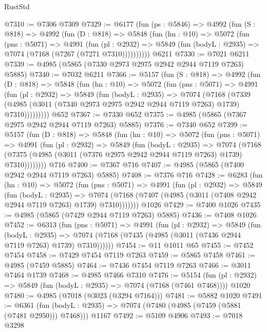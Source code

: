 \begin{lexlean}{RustStd}
\begin{coremodule}
@7310 := @7306 @7309
@7329 := @6177
    (fun (ps : @5846) =>
    @4992
      (fun (S : @818) =>
      @4992
        (fun (D : @818) =>
        @5848
          (fun (hn : @10) =>
          @5072
            (fun (pns : @5071) =>
            @4991
              (fun (pl : @2932) =>
              @5849 (fun (bodyL : @2935) => @7074 (@7168 (@7267 (@7271 @7310))))))))))
    @6211
@7330 := @7021 @6211
@7339 := @4985 (@5865 (@7330 @2973 @2975 @2942 @2944 @7119 @7263) @5885)
@7340 := @7032 @6211
@7366 := @5157
    (fun (S : @818) =>
    @4992
      (fun (D : @818) =>
      @5848
        (fun (hn : @10) =>
        @5072
          (fun (pns : @5071) =>
          @4991
            (fun (pl : @2932) =>
            @5849
              (fun (bodyL : @2935) =>
              @7074
                (@7168
                  (@7339
                    (@4985 (@3011 (@7340 @2973 @2975 @2942 @2944 @7119 @7263) @1739) @7310)))))))))
    @652
@7367 := @7330 @652
@7375 := @4985 (@5865 (@7367 @2975 @2942 @2944 @7119 @7263) @5885)
@7376 := @7340 @652
@7399 := @5157
    (fun (D : @818) =>
    @5848
      (fun (hn : @10) =>
      @5072
        (fun (pns : @5071) =>
        @4991
          (fun (pl : @2932) =>
          @5849
            (fun (bodyL : @2935) =>
            @7074
              (@7168 (@7375 (@4985 (@3011 (@7376 @2975 @2942 @2944 @7119 @7263) @1739) @7310))))))))
    @716
@7400 := @7367 @716
@7407 := @4985 (@5865 (@7400 @2942 @2944 @7119 @7263) @5885)
@7408 := @7376 @716
@7428 := @6283
    (fun (hn : @10) =>
    @5072
      (fun (pns : @5071) =>
      @4991
        (fun (pl : @2932) =>
        @5849
          (fun (bodyL : @2935) =>
          @7074 (@7168 (@7407 (@4985 (@3011 (@7408 @2942 @2944 @7119 @7263) @1739) @7310)))))))
    @1026
@7429 := @7400 @1026
@7435 := @4985 (@5865 (@7429 @2944 @7119 @7263) @5885)
@7436 := @7408 @1026
@7452 := @6313
    (fun (pns : @5071) =>
    @4991
      (fun (pl : @2932) =>
      @5849
        (fun (bodyL : @2935) =>
        @7074 (@7168 (@7435 (@4985 (@3011 (@7436 @2944 @7119 @7263) @1739) @7310))))))
@7454 := @11 @1011 @65
@7455 := @7452 @7454
@7458 := @7429 @7454 @7119 @7263
@7459 := @5865 @7458
@7461 := @4985 (@7459 @5885)
@7464 := @7436 @7454 @7119 @7263
@7466 := @3011 @7464 @1739
@7468 := @4985 @7466 @7310
@7476 := @5154
    (fun (pl : @2932) => @5849 (fun (bodyL : @2935) => @7074 (@7168 (@7461 @7468))))
    @1020
@7480 := @4985 (@7018 (@3023 (@3294 @7164)))
@7481 := @5882 @1020
@7491 := @6361
    (fun (bodyL : @2935) => @7074 (@7480 (@4985 (@7459 (@5881 (@7481 @2950))) @7468)))
    @1167
@7492 := @5109 @4906
@7493 := @7018 @3298

\end{coremodule}
\end{lexlean}

